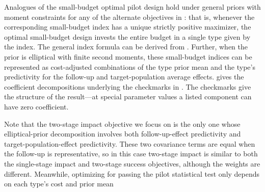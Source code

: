 Analogues of the small-budget optimal pilot design  hold under general priors with moment constraints for any of the alternate objectives in : that is, whenever the corresponding small-budget index has a unique strictly positive maximizer, the optimal small-budget design invests the entire budget in a single type given by the index.
The general index formula can be derived from .
Further, when the prior is elliptical with finite second moments, these small-budget indices can be represented as cost-adjusted combinations of the type prior mean and the type's predictivity for the follow-up and target-population average effects.
 gives the coefficient decompositions underlying the checkmarks in .
The checkmarks give the structure of the result---at special parameter values a listed component can have zero coefficient.

Note that the two-stage impact objective we focus on is the only one whose elliptical-prior decomposition involves both follow-up-effect predictivity and target-population-effect predictivity.
These two covariance terms are equal when the follow-up is representative, so in this case two-stage impact is similar to both the single-stage impact and two-stage success objectives, although the weights are different.
Meanwhile, optimizing for passing the pilot statistical test only depends on each type's cost and prior mean
